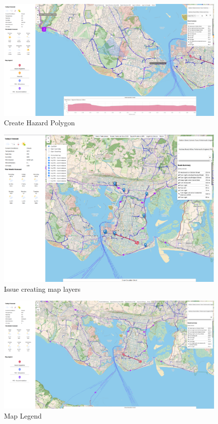 \begin{figure}[!ht]
    \centering
    \includegraphics[width=425px]{figures/Progress Images/Iteration-2/SR32-37/sr32-create-polygon.png}
    \caption{Create Hazard Polygon}
    \label{fig:create-polygon}
\end{figure}

\begin{figure}[!ht]
    \centering
    \includegraphics[width=425px]{figures/Progress Images/Iteration-2/SR40-45/SR40 - Issue, multiple layers .png}
    \caption{Issue creating map layers}
    \label{fig:layer-issue}
\end{figure}

\begin{figure}[!ht]
    \centering
    \includegraphics[width=425px]{figures/Progress Images/Iteration-2/SR40-45/SR40 - Map Legend.png}
    \caption{Map Legend}
    \label{fig:map-legend}
\end{figure}

